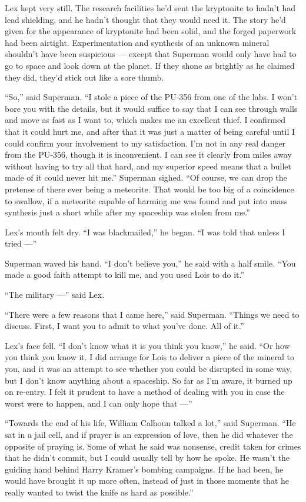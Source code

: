 Lex kept very still. The research facilities he'd sent the kryptonite to
hadn't had lead shielding, and he hadn't thought that they would need
it. The story he'd given for the appearance of kryptonite had been
solid, and the forged paperwork had been airtight. Experimentation and
synthesis of an unknown mineral shouldn't have been suspicious ---
except that Superman would only have had to go to space and look down at
the planet. If they shone as brightly as he claimed they did, they'd
stick out like a sore thumb.

``So,'' said Superman. ``I stole a piece of the PU‐356 from one of the
labs. I won't bore you with the details, but it would suffice to say
that I can see through walls and move as fast as I want to, which makes
me an excellent thief. I confirmed that it could hurt me, and after that
it was just a matter of being careful until I could confirm your
involvement to my satisfaction. I'm not in any real danger from the
PU‐356, though it is inconvenient. I can see it clearly from miles away
without having to try all that hard, and my superior speed means that a
bullet made of it could never hit me.'' Superman sighed. ``Of course, we
can drop the pretense of there ever being a meteorite. That would be too
big of a coincidence to swallow, if a meteorite capable of harming me
was found and put into mass synthesis just a short while after my
spaceship was stolen from me.''

Lex's mouth felt dry. ``I was blackmailed,'' he began. ``I was told that
unless I tried ---''

Superman waved his hand. ``I don't believe you,'' he said with a half
smile. ``You made a good faith attempt to kill me, and you used Lois to
do it.''

``The military ---'' said Lex.

``There were a few reasons that I came here,'' said Superman. ``Things
we need to discuss. First, I want you to admit to what you've done. All
of it.''

Lex's face fell. ``I don't know what it is you think you know,'' he
said. ``Or how you think you know it. I did arrange for Lois to deliver
a piece of the mineral to you, and it was an attempt to see whether you
could be disrupted in some way, but I don't know anything about a
spaceship. So far as I'm aware, it burned up on re‐entry. I felt it
prudent to have a method of dealing with you in case the worst were to
happen, and I can only hope that ---''

``Towards the end of his life, William Calhoun talked a lot,'' said
Superman. ``He sat in a jail cell, and if prayer is an expression of
love, then he did whatever the opposite of praying is. Some of what he
said was nonsense, credit taken for crimes that he didn't commit, but I
could usually tell by how he spoke. He wasn't the guiding hand behind
Harry Kramer's bombing campaigns. If he had been, he would have brought
it up more often, instead of just in those moments that he really wanted
to twist the knife as hard as possible.''

